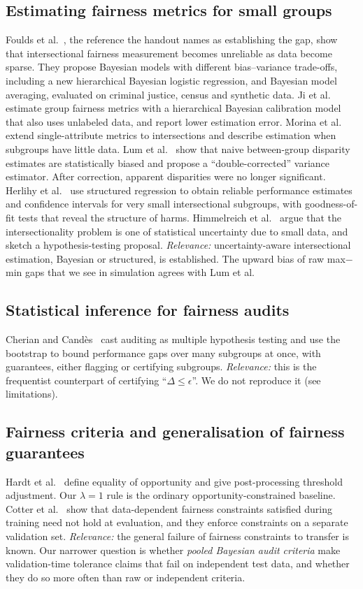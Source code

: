 \documentclass[10pt]{article}
\begin{document}
\subsection{Estimating fairness metrics for small groups}
Foulds et al.~\cite{foulds2020bayes}, the reference the handout names as establishing the gap, show that intersectional
fairness measurement becomes unreliable as data become sparse. They propose Bayesian models with different bias--variance
trade-offs, including a new hierarchical Bayesian logistic regression, and Bayesian model averaging, evaluated on criminal
justice, census and synthetic data. Ji et al.~\cite{ji2020} estimate group fairness metrics with a hierarchical Bayesian
calibration model that also uses unlabeled data, and report lower estimation error. Morina et al.~\cite{morina2019} extend
single-attribute metrics to intersections and describe estimation when subgroups have little data. Lum et
al.~\cite{lum2022} show that naive between-group disparity estimates are statistically biased and propose a
``double-corrected'' variance estimator. After correction, apparent disparities were no longer significant. Herlihy et
al.~\cite{herlihy2024} use structured regression to obtain reliable performance estimates and confidence intervals for
very small intersectional subgroups, with goodness-of-fit tests that reveal the structure of harms. Himmelreich et
al.~\cite{himmelreich2025} argue that the intersectionality problem is one of statistical uncertainty due to small data,
and sketch a hypothesis-testing proposal. \emph{Relevance:} uncertainty-aware intersectional estimation, Bayesian or
structured, is established. The upward bias of raw max$-$min gaps that we see in simulation agrees with Lum et al.

\subsection{Statistical inference for fairness audits}
Cherian and Cand\`es~\cite{cherian2024} cast auditing as multiple hypothesis testing and use the bootstrap to bound
performance gaps over many subgroups at once, with guarantees, either flagging or certifying subgroups. \emph{Relevance:}
this is the frequentist counterpart of certifying ``$\Delta\le\epsilon$''. We do not reproduce it (see limitations).

\subsection{Fairness criteria and generalisation of fairness guarantees}
Hardt et al.~\cite{hardt2016} define equality of opportunity and give post-processing threshold adjustment. Our
$\lambda=1$ rule is the ordinary opportunity-constrained baseline. Cotter et al.~\cite{cotter2019} show that
data-dependent fairness constraints satisfied during training need not hold at evaluation, and they enforce constraints on
a separate validation set. \emph{Relevance:} the general failure of fairness constraints to transfer is known. Our
narrower question is whether \emph{pooled Bayesian audit criteria} make validation-time tolerance claims that fail on
independent test data, and whether they do so more often than raw or independent criteria.
\end{document}
